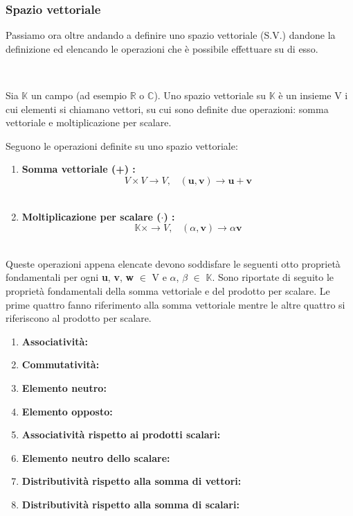 \documentclass[../main.tex]{subfiles}
\begin{document}
\subsubsection{Spazio vettoriale}

Passiamo ora oltre andando a definire uno spazio vettoriale (S.V.) dandone la definizione ed elencando le operazioni che è possibile effettuare su di esso.

\begin{theorem}\

Sia $\mathbb{K}$ un campo (ad esempio $\mathbb{R}$ o $\mathbb{C}$). Uno spazio vettoriale su $\mathbb{K}$ è un insieme V i cui elementi si chiamano vettori, su cui sono definite due operazioni: somma vettoriale e moltiplicazione per scalare.
	
\end{theorem}

Seguono le operazioni definite su uno spazio vettoriale:

\begin{enumerate}
	\item[\textbf{-}]\textbf{Somma vettoriale (+) :} \[ V \times V \rightarrow V, \hspace{10pt} (\textbf{u},\textbf{v}) \rightarrow \textbf{u} + \textbf{v}     \]\
	\item[\textbf{-}]\textbf{Moltiplicazione per scalare ($\cdot$) :} \[ \mathbb{K} \times \rightarrow V, \hspace{10pt} (\alpha,\textbf{v}) \rightarrow \alpha \textbf{v}\]\
\end{enumerate}

Queste operazioni appena elencate devono soddisfare le seguenti otto proprietà fondamentali per ogni \textbf{u}, \textbf{v}, \textbf{w} $\in$ V e $\alpha$, $\beta$ $\in$ $\mathbb{K}$.
Sono riportate di seguito le proprietà fondamentali della somma vettoriale e del prodotto per scalare. Le prime quattro fanno riferimento alla somma vettoriale mentre le altre quattro si riferiscono al prodotto per scalare.

\begin{enumerate}
	\item[\textbf{-}]\textbf{Associatività:}
	\item[\textbf{-}]\textbf{Commutatività:}
	\item[\textbf{-}]\textbf{Elemento neutro:}
	\item[\textbf{-}]\textbf{Elemento opposto:}
	\item[\textbf{-}]\textbf{Associatività rispetto ai prodotti scalari:}
	\item[\textbf{-}]\textbf{Elemento neutro dello scalare:}
	\item[\textbf{-}]\textbf{Distributività rispetto alla somma di vettori:}
	\item[\textbf{-}]\textbf{Distributività rispetto alla somma di scalari:}
\end{enumerate}
\end{document}
